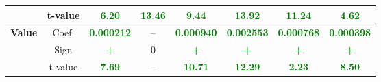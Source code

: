 \documentclass[11pt,english,a4paper,hidelinks]{book}
\begin{document}
\begin{table}[H]
\begin{tabular}{lccccccc}
            & t-value & \textbf{\textcolor{green}{6.20}} & \textbf{\textcolor{green}{13.46}} & \textbf{\textcolor{green}{9.44}} & \textbf{\textcolor{green}{13.92}} & \textbf{\textcolor{green}{11.24}} & \textbf{\textcolor{green}{4.62}} \\
        \midrule
        \multirow{3}{*}{\textbf{Value}} 
            & Coef. & \textbf{\textcolor{green}{0.000212}} & -- & \textbf{\textcolor{green}{0.000940}} & \textbf{\textcolor{green}{0.002553}} & \textbf{\textcolor{green}{0.000768}} & \textbf{\textcolor{green}{0.000398}} \\
            & Sign & \textbf{\textcolor{green}{+}} & 0 & \textbf{\textcolor{green}{+}} & \textbf{\textcolor{green}{+}} & \textbf{\textcolor{green}{+}} & \textbf{\textcolor{green}{+}} \\
            & t-value & \textbf{\textcolor{green}{7.69}} & -- & \textbf{\textcolor{green}{10.71}} & \textbf{\textcolor{green}{12.29}} & \textbf{\textcolor{green}{2.23}} & \textbf{\textcolor{green}{8.50}} \\
        \bottomrule
    \end{tabular}
    \label{tab:latam_first_model_consistency}
\end{table}
\end{document}
